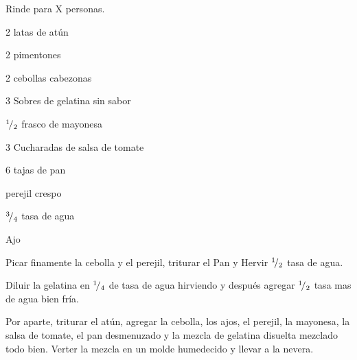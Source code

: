 
Rinde para X personas.


\begin{ingredientes}
\item 2 latas de atún
\item 2 pimentones
\item 2 cebollas cabezonas
\item 3 Sobres de gelatina sin sabor
\item ${}^{1}\!/_{2}$ frasco de mayonesa
\item 3 Cucharadas de salsa de tomate
\item 6 tajas de pan
\item perejil crespo
\item ${}^{3}\!/_{4}$ tasa de agua
\item Ajo
\end{ingredientes}

\preparacion


Picar finamente la cebolla y el perejil, triturar el Pan y  Hervir ${}^{1}\!/_{2}$ tasa de agua.

Diluir la gelatina en ${}^{1}\!/_{4}$ de tasa de agua hirviendo y después agregar ${}^{1}\!/_{2}$ tasa mas de agua bien fría.

Por aparte, triturar el atún, agregar la cebolla, los ajos, el perejil, la mayonesa, la salsa de tomate, el pan desmenuzado y la mezcla de gelatina disuelta mezclado todo bien. Verter la mezcla en un molde humedecido y llevar a la nevera.